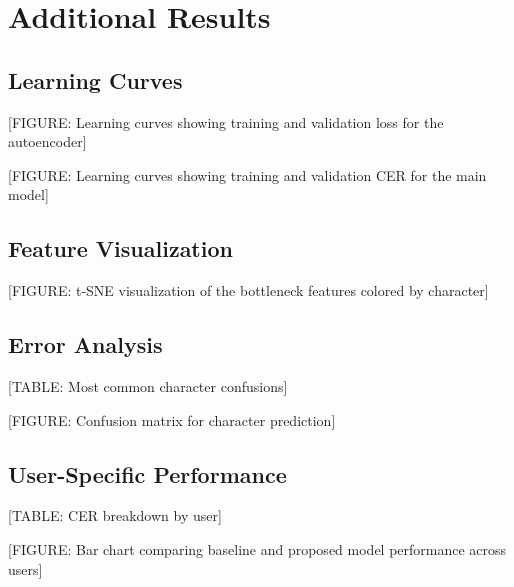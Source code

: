 \section{Additional Results}

\subsection{Learning Curves}

[FIGURE: Learning curves showing training and validation loss for the autoencoder]

[FIGURE: Learning curves showing training and validation CER for the main model]

\subsection{Feature Visualization}

[FIGURE: t-SNE visualization of the bottleneck features colored by character]

\subsection{Error Analysis}

[TABLE: Most common character confusions]

[FIGURE: Confusion matrix for character prediction]

\subsection{User-Specific Performance}

[TABLE: CER breakdown by user]

[FIGURE: Bar chart comparing baseline and proposed model performance across users] 